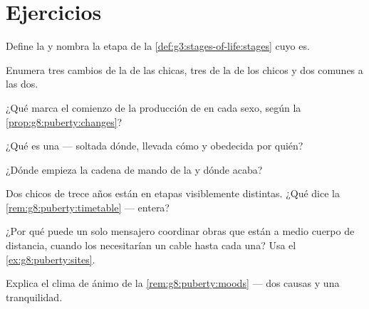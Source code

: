 \section{Ejercicios}

\begin{exercise}[$\star$]\label{exo:g8:puberty:1}
Define la  y nombra la etapa de la
\cref{def:g3:stages-of-life:stages} cuyo  es.
\end{exercise}

\begin{exercise}[$\star$]\label{exo:g8:puberty:2}
Enumera tres cambios de la  de las chicas, tres de la de los
chicos y dos comunes a las dos.
\end{exercise}

\begin{exercise}[$\star$]\label{exo:g8:puberty:3}
¿Qué marca el comienzo de la producción de  en cada sexo, según
la \cref{prop:g8:puberty:changes}?
\end{exercise}

\begin{exercise}[$\star$]\label{exo:g8:puberty:4}
¿Qué es una  --- soltada dónde, llevada cómo y obedecida por
quién?
\end{exercise}

\begin{exercise}[$\star$]\label{exo:g8:puberty:5}
¿Dónde empieza la cadena de mando de la  y dónde acaba?
\end{exercise}

\begin{exercise}[$\star$]\label{exo:g8:puberty:6}
Dos chicos de trece años están en etapas visiblemente distintas. ¿Qué
dice la \cref{rem:g8:puberty:timetable} --- entera?
\end{exercise}

\begin{exercise}[$\star\star$]\label{exo:g8:puberty:7}
¿Por qué puede un solo mensajero coordinar obras que están a medio
cuerpo de distancia, cuando los  necesitarían un cable hasta
cada una? Usa el \cref{ex:g8:puberty:sites}.
\end{exercise}

\begin{exercise}[$\star\star$]\label{exo:g8:puberty:8}
Explica el clima de ánimo de la \cref{rem:g8:puberty:moods} --- dos
causas y una tranquilidad.
\end{exercise}

